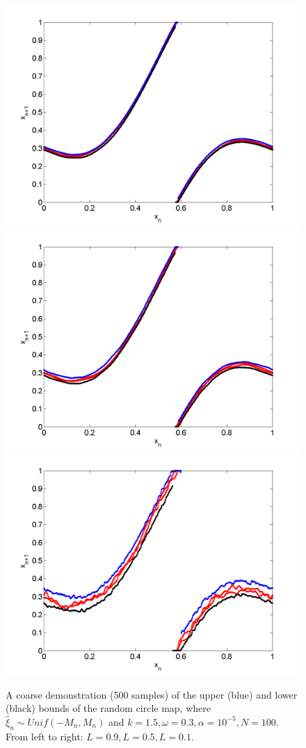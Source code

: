 \begin{figure}[htp]
\caption[Upper and lower bounds on the random circle map, with a uniform
distribution, where $k=1.5,\omega=0.3$]{A coarse
  demonstration (500 samples) of the upper (blue) and lower (black)
  bounds of the random circle map, where $\hat{\xi}_n\sim Unif(-M_n,M_n)$
  and $k=1.5,\omega=0.3,\alpha = 10^{-5},N=100$. From left to right:
  $L=0.9,L=0.5,L=0.1$.}\label{fig:circ_u_envelope2}
\centering
\includegraphics[width=.3\textwidth]{figs/envelope_unif_500_k15_L09_w03.png}\hfill
\includegraphics[width=.3\textwidth]{figs/envelope_unif_500_k15_L05_w03.png}\hfill
\includegraphics[width=.3\textwidth]{figs/envelope_unif_500_k15_L01_w03.png}
\end{figure}

